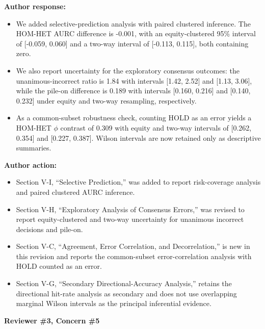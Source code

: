 \documentclass[11pt]{article}
\newcommand{\concern}[1]{\textbf{\color{ReviewerGreen}#1}}
\begin{document}
\textbf{Author response:}

\begin{itemize}

\item We added selective-prediction analysis with paired clustered inference. The HOM-HET AURC difference is -0.001, with an equity-clustered 95\% interval of [-0.059, 0.060] and a two-way interval of [-0.113, 0.115], both containing zero.

\item We also report uncertainty for the exploratory consensus outcomes: the unanimous-incorrect ratio is 1.84 with intervals [1.42, 2.52] and [1.13, 3.06], while the pile-on difference is 0.189 with intervals [0.160, 0.216] and [0.140, 0.232] under equity and two-way resampling, respectively.

\item As a common-subset robustness check, counting HOLD as an error yields a HOM-HET $\phi$ contrast of 0.309 with equity and two-way intervals of [0.262, 0.354] and [0.227, 0.387]. Wilson intervals are now retained only as descriptive summaries.

\end{itemize}

\textbf{Author action:}

\begin{itemize}

\item Section V-I, ``Selective Prediction,'' was added to report risk-coverage analysis and paired clustered AURC inference.

\item Section V-H, ``Exploratory Analysis of Consensus Errors,'' was revised to report equity-clustered and two-way uncertainty for unanimous incorrect decisions and pile-on.

\item Section V-C, ``Agreement, Error Correlation, and Decorrelation,'' is new in this revision and reports the common-subset error-correlation analysis with HOLD counted as an error.

\item Section V-G, ``Secondary Directional-Accuracy Analysis,'' retains the directional hit-rate analysis as secondary and does not use overlapping marginal Wilson intervals as the principal inferential evidence.

\end{itemize}

\vspace{12pt}
\concern{Reviewer \#3, Concern \#5}
\end{document}
